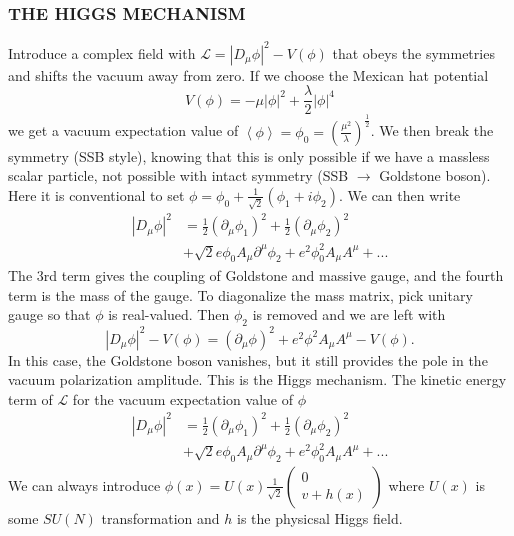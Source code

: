 \documentclass[a4paper, norsk, 8pt, landscape]{article}
\newcommand{\EQU}[1] { \begin{equation*} \begin{split}
#1
\end{split} \end{equation*} }
\newcommand{\expe}[1] { \left\langle#1\right\rangle }
\begin{document}
\begin{multicols*}{3}
\subsubsection*{\small THE HIGGS MECHANISM}
Introduce a complex field with $\mathcal{L}=|D_\mu \phi|^2 -V(\phi)$ that obeys the symmetries
and shifts the vacuum away from zero. If we choose the Mexican hat potential
\[
V(\phi) = -\mu |\phi|^2 + \frac{\lambda}{2}|\phi|^4
\]
we get a vacuum expectation value of $\expe{\phi}=\phi_0 = \left(\frac{\mu^2}{\lambda}\right)^\frac{1}{2}$.
We then break the symmetry (SSB style), knowing that this is only possible if we have a massless
scalar particle, not possible with intact symmetry (SSB $\rightarrow$ Goldstone boson).
Here it is conventional to set $\phi = \phi_0 + \frac{1}{\sqrt{2}}(\phi_1+i\phi_2)$. We can then write
\EQU{
|D_{\mu} \phi|^2 &= \frac{1}{2} (\partial_{\mu} \phi_1)^2 + \frac{1}{2}(\partial_{\mu} \phi_2)^2\\
& + \sqrt{2}e \phi_0 A_{\mu} \partial^{\mu} \phi_2 + e^2 \phi_0^2 A_{\mu} A^{\mu}+...
}
The 3rd term gives the coupling of Goldstone and massive gauge, and the fourth
term is the mass of the gauge.
To diagonalize the mass matrix, pick unitary gauge so that $\phi$ is real-valued. Then $\phi_2$ is removed and
we are left with
\[
|D_{\mu} \phi|^2-V(\phi)
=
(\partial_\mu \phi)^2 + e^2\phi^2 A_\mu A^\mu -V(\phi).
\]
In this case, the Goldstone boson vanishes, but it still provides the pole in the vacuum
polarization amplitude. This is the Higgs mechanism. The kinetic energy term of
$\mathcal{L}$ for the vacuum expectation value of $\phi$
\begin{align*}
|D_{\mu} \phi|^2 &= \frac{1}{2} (\partial_{\mu} \phi_1)^2 + \frac{1}{2}(\partial_{\mu} \phi_2)^2\\
& + \sqrt{2}e \phi_0 A_{\mu} \partial^{\mu} \phi_2 + e^2 \phi_0^2 A_{\mu} A^{\mu}+...
\end{align*}
We can always introduce
$\phi(x)=U(x)\frac{1}{\sqrt{2}}
\left(\begin{matrix}
0 \\ v + h(x)
\end{matrix}\right)$
where $U(x)$ is some $SU(N)$ transformation and $h$ is the physicsal Higgs field.


















\end{multicols*}
\end{document}
